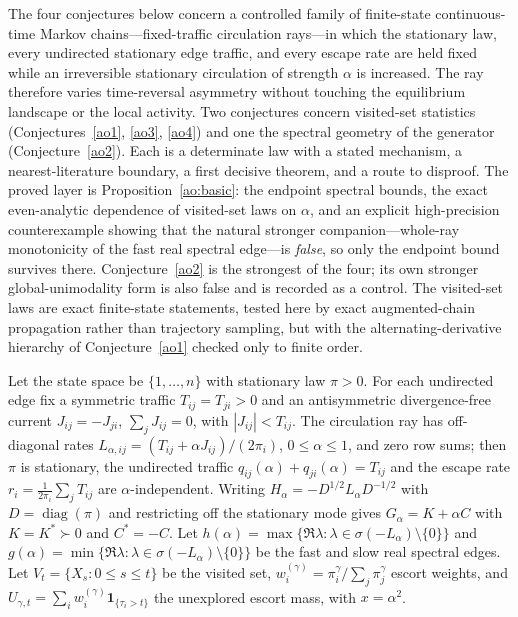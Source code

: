 \documentclass[11pt]{article}
\theoremstyle{definition}
\begin{document}
The four conjectures below concern a controlled family of finite-state continuous-time Markov chains---fixed-traffic circulation rays---in which the stationary law, every undirected stationary edge traffic, and every escape rate are held fixed while an irreversible stationary circulation of strength $\alpha$ is increased.  The ray therefore varies time-reversal asymmetry without touching the equilibrium landscape or the local activity.  Two conjectures concern visited-set statistics (Conjectures~\ref{ao1}, \ref{ao3}, \ref{ao4}) and one the spectral geometry of the generator (Conjecture~\ref{ao2}).  Each is a determinate law with a stated mechanism, a nearest-literature boundary, a first decisive theorem, and a route to disproof.  The proved layer is Proposition~\ref{ao:basic}: the endpoint spectral bounds, the exact even-analytic dependence of visited-set laws on $\alpha$, and an explicit high-precision counterexample showing that the natural stronger companion---whole-ray monotonicity of the fast real spectral edge---is \emph{false}, so only the endpoint bound survives there.  Conjecture~\ref{ao2} is the strongest of the four; its own stronger global-unimodality form is also false and is recorded as a control.  The visited-set laws are exact finite-state statements, tested here by exact augmented-chain propagation rather than trajectory sampling, but with the alternating-derivative hierarchy of Conjecture~\ref{ao1} checked only to finite order.

Let the state space be $\{1,\dots,n\}$ with stationary law $\pi>0$.  For each undirected edge fix a symmetric traffic $T_{ij}=T_{ji}>0$ and an antisymmetric divergence-free current $J_{ij}=-J_{ji}$, $\sum_jJ_{ij}=0$, with $|J_{ij}|<T_{ij}$.  The circulation ray has off-diagonal rates $L_{\alpha,ij}=(T_{ij}+\alpha J_{ij})/(2\pi_i)$, $0\le\alpha\le1$, and zero row sums; then $\pi$ is stationary, the undirected traffic $q_{ij}(\alpha)+q_{ji}(\alpha)=T_{ij}$ and the escape rate $r_i=\tfrac1{2\pi_i}\sum_jT_{ij}$ are $\alpha$-independent.  Writing $H_\alpha=-D^{1/2}L_\alpha D^{-1/2}$ with $D=\operatorname{diag}(\pi)$ and restricting off the stationary mode gives $G_\alpha=K+\alpha C$ with $K=K^\ast\succ0$ and $C^\ast=-C$.  Let $h(\alpha)=\max\{\Re\lambda:\lambda\in\sigma(-L_\alpha)\setminus\{0\}\}$ and $g(\alpha)=\min\{\Re\lambda:\lambda\in\sigma(-L_\alpha)\setminus\{0\}\}$ be the fast and slow real spectral edges.  Let $V_t=\{X_s:0\le s\le t\}$ be the visited set, $w_i^{(\gamma)}=\pi_i^\gamma/\sum_j\pi_j^\gamma$ escort weights, and $U_{\gamma,t}=\sum_iw_i^{(\gamma)}\mathbf 1_{\{\tau_i>t\}}$ the unexplored escort mass, with $x=\alpha^2$.
\end{document}

